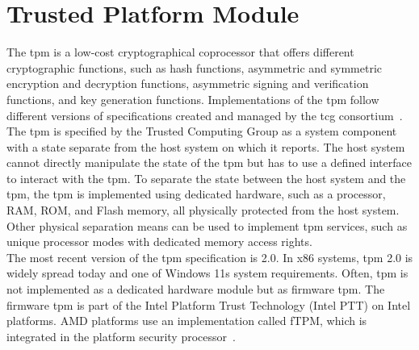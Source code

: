 \section{Trusted Platform Module}
\label{sec:20:tpm}
The \gls{tpm} is a low-cost cryptographical coprocessor that offers different
cryptographic functions, such as hash functions, asymmetric and symmetric
encryption and decryption functions, asymmetric signing and verification
functions, and key generation functions. Implementations of the \gls{tpm} follow
different versions of specifications created and managed by the \gls{tcg}
consortium~\cite{tpm_architecture}. The \gls{tpm} is specified by the Trusted
Computing Group as a system component with a state separate from the host system
on which it reports. The host system cannot directly manipulate the state of the
\gls{tpm} but has to use a defined interface to interact with the \gls{tpm}. To
separate the state between the host system and the \gls{tpm}, the \gls{tpm} is
implemented using dedicated hardware, such as a processor, RAM, ROM, and Flash
memory, all physically protected from the host system. Other physical separation
means can be used to implement \gls{tpm} services, such as unique processor
modes with dedicated memory access rights.\\

The most recent version of the \gls{tpm} specification is 2.0.
In x86 systems, \gls{tpm} 2.0 is widely spread today and one of Windows 11s
system requirements. Often, \gls{tpm} is not implemented as a dedicated hardware
module but as firmware \gls{tpm}. The firmware \gls{tpm} is part of the Intel
Platform Trust Technology (Intel PTT) on Intel platforms. AMD platforms use an
implementation called fTPM, which is integrated in the platform security
processor~\cite{pirker2024brief}. \\

